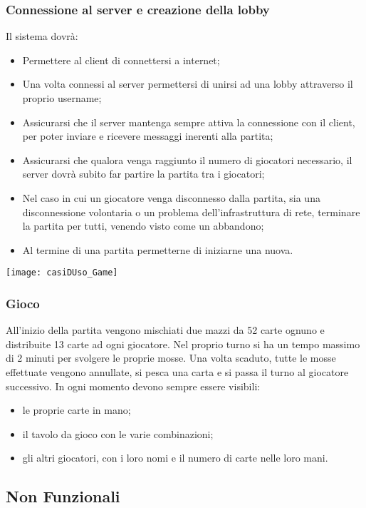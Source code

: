 \subsubsection{Connessione al server e creazione della lobby}
Il sistema dovrà:
\begin{itemize}
    \item Permettere al client di connettersi a internet;
    \item Una volta connessi al server permettersi di unirsi ad una lobby attraverso il proprio username;
    \item Assicurarsi che il server mantenga sempre attiva la connessione con il client, per poter inviare e ricevere messaggi inerenti alla partita;
    \item Assicurarsi che qualora venga raggiunto il numero di giocatori necessario, il server dovrà subito far partire la partita tra i giocatori;
    \item Nel caso in cui un giocatore venga disconnesso dalla partita, sia una disconnessione volontaria o un problema dell’infrastruttura di rete, terminare la partita per tutti, venendo visto come un abbandono;
    \item Al termine di una partita permetterne di iniziarne una nuova.
\end{itemize}
\begin{center}
    \texttt{[image: casiDUso\_Game]}
\end{center}
\subsubsection{Gioco}
All’inizio della partita vengono mischiati due mazzi da 52 carte ognuno e distribuite 13 carte ad ogni giocatore.
Nel proprio turno si ha un tempo massimo di 2 minuti per svolgere le proprie mosse.
Una volta scaduto, tutte le mosse effettuate vengono annullate, si pesca una carta e si passa il turno al giocatore successivo.
In ogni momento devono sempre essere visibili:
\begin{itemize}
    \item le proprie carte in mano;
    \item il tavolo da gioco con le varie combinazioni;
    \item gli altri giocatori, con i loro nomi e il numero di carte nelle loro mani.
\end{itemize}

\subsection{Non Funzionali}

